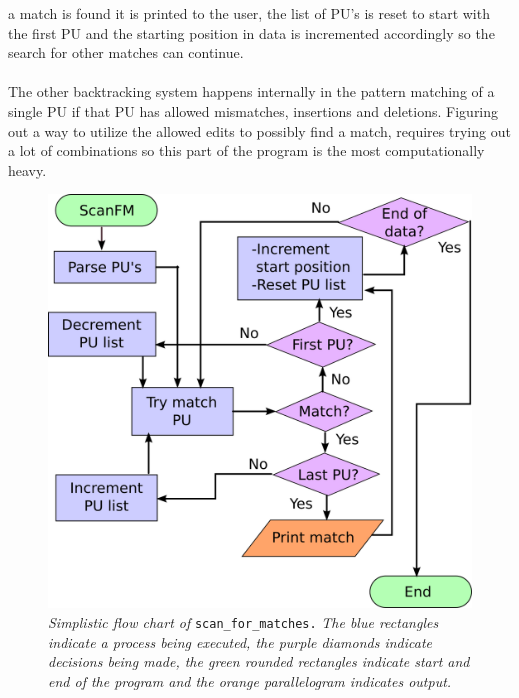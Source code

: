 \documentclass[12pt]{article}
\newcommand{\scmp}{\texttt{scan\_for\_matches.} }
\newcommand{\pu}{PU }
\newcommand{\pus}{PU's }
\begin{document}
a match is found it is printed to the user, the list of \pus is reset to start with the first \pu and the 
starting position in data is incremented accordingly so the search for other matches can continue. \\ \\
The other backtracking system happens internally in the pattern matching of a single \pu if that \pu has allowed
mismatches, insertions and deletions. Figuring out a way to utilize the allowed edits to possibly find a match, requires
trying out a lot of combinations so this part of the program is the most computationally heavy. 
\begin{figure}[h]
\begin{center}
\includegraphics[scale=0.4]{Diagrams/ScanfmFlow.png}
\end{center}
\caption{\textit{Simplistic flow chart of} \scmp \textit{The blue rectangles indicate a process being executed, 
the purple diamonds indicate decisions being made, the green rounded rectangles indicate start and end of the program
and the orange parallelogram indicates output.}}
\end{figure}
\end{document}
